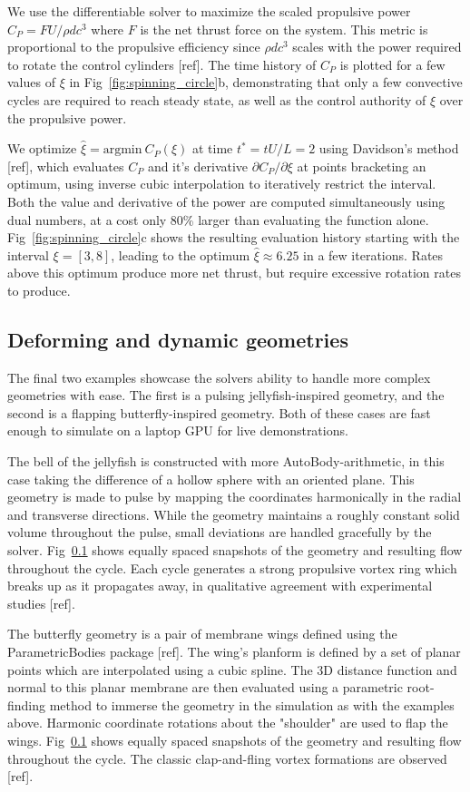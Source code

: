 \documentclass[final,3p,times]{elsarticle}
\begin{document}
We use the differentiable solver to maximize the scaled propulsive power $C_P = FU/\rho dc^3$ where $F$ is the net thrust force on the system. This metric is  proportional to the propulsive efficiency since $\rho dc^3$ scales with the power required to rotate the control cylinders [ref]. The time history of $C_P$ is plotted for a few values of $\xi$ in Fig~\ref{fig:spinning_circle}b, demonstrating that only a few convective cycles are required to reach steady state, as well as the control authority of $\xi$ over the propulsive power.

We optimize $\hat\xi=\text{argmin}\ C_P(\xi)$ at time $t^*=tU/L=2$ using Davidson's method [ref], which evaluates $C_P$ and it's derivative $\partial C_P/\partial \xi$ at points bracketing an optimum, using inverse cubic interpolation to iteratively restrict the interval. Both the value and derivative of the power are computed simultaneously using dual numbers, at a cost only 80\% larger than evaluating the function alone. Fig~\ref{fig:spinning_circle}c shows the resulting evaluation history starting with the interval $\xi=[3,8]$, leading to the optimum $\hat\xi\approx 6.25$ in a few iterations. Rates above this optimum produce more net thrust, but require excessive rotation rates to produce.

\subsection{Deforming and dynamic geometries}

The final two examples showcase the solvers ability to handle more complex geometries with ease. The first is a pulsing jellyfish-inspired geometry, and the second is a flapping butterfly-inspired geometry. Both of these cases are fast enough to simulate on a laptop GPU for live demonstrations.

The bell of the jellyfish is constructed with more AutoBody-arithmetic, in this case taking the difference of a hollow sphere with an oriented plane. This geometry is made to pulse by mapping the coordinates harmonically in the radial and transverse directions. While the geometry maintains a roughly constant solid volume throughout the pulse, small deviations are handled gracefully by the solver. Fig~\ref{} shows equally spaced snapshots of the geometry and resulting flow throughout the cycle. Each cycle generates a strong propulsive vortex ring which breaks up as it propagates away, in qualitative agreement with experimental studies [ref].

The butterfly geometry is a pair of membrane wings defined using the ParametricBodies package [ref]. The wing's planform is defined by a set of planar points which are interpolated using a cubic spline. The 3D distance function and normal to this planar membrane are then evaluated using a parametric root-finding method to immerse the geometry in the simulation as with the examples above. Harmonic coordinate rotations about the "shoulder" are used to flap the wings. Fig~\ref{} shows equally spaced snapshots of the geometry and resulting flow throughout the cycle. The classic clap-and-fling vortex formations are observed [ref].
\end{document}
